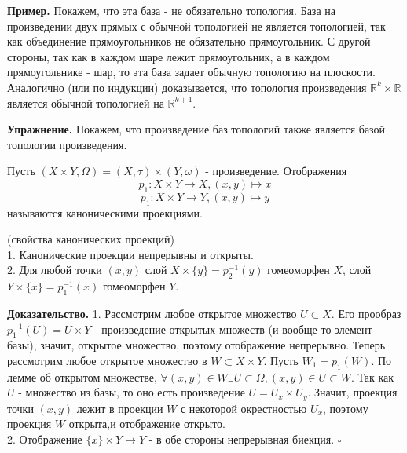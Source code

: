 \textbf{Пример.} Покажем, что эта база -  не обязательно топология. База на
произведении двух прямых с обычной топологией не является топологией,
так как объединение прямоугольников не обязательно прямоугольник. С 
другой стороны, так как в каждом шаре лежит прямоугольник, а в каждом 
прямоугольнике - шар, то эта база задает обычную топологию на 
плоскости. Аналогично (или по индукции) доказывается, что топология
произведения $\mathbb{R}^k\times \mathbb{R}$ является обычной топологией на 
$\mathbb{R}^{k+1}$. 

\textbf{Упражнение.} Покажем, что произведение баз топологий также
является базой топологии произведения. 

\begin{defin}
Пусть $(X\times Y,\Omega)=(X,\tau)\times (Y,\omega)$ - произведение. 
Отображения
$$p_1\colon X\times Y\to X,(x,y)\mapsto x$$ 
$$p_1\colon X\times Y\to Y,(x,y)\mapsto y$$
называются каноническими проекциями.
\end{defin}
\begin{theor}
    (свойства канонических проекций)\\
    1. Канонические проекции непрерывны и открыты.\\
    2. Для любой точки $(x,y)$ слой $X\times \{y\}=p^{-1}_2(y)$ гомеоморфен
    $X$, слой  $Y\times \{x\}=p^{-1}_1(x)$ гомеоморфен $Y$.
\end{theor}
\textbf{Доказательство.} 1. Рассмотрим любое открытое множество $U\subset X$.
Его прообраз $p^{-1}_1(U)=U\times Y$ - произведение открытых множеств
(и вообще-то элемент базы), значит, открытое множество, поэтому отображение
непрерывно. Теперь рассмотрим любое открытое множество в $W\subset X\times Y$.
Пусть $W_1=p_1(W)$. По лемме об открытом множестве,  $\forall (x,y)\in W
\exists U\subset \Omega,(x,y)\in U\subset W$. Так как $U$ - множество из
базы, то оно есть произведение  $U=U_x \times U_y$. Значит, проекция точки
$(x,y)$ лежит в проекции  $W$ с некоторой окрестностью  $U_x$, поэтому
проекция  $W$ открыта,и отображение открыто.\\
2. Отображение $\{x\}\times Y\to Y$ - в обе стороны непрерывная биекция.
$\square$ 

